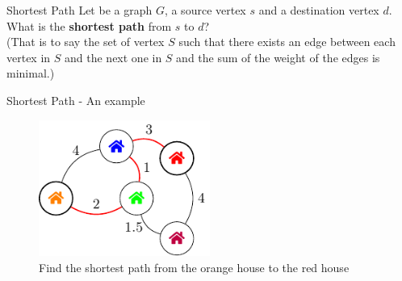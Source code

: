 \documentclass[11pt]{beamer}
\begin{document}
\begin{frame}{Shortest Path}
	Let be a graph $G$, a source vertex $s$ and a destination vertex $d$. \\
	What is the \textbf{shortest path} from $s$ to $d$? \\
	(That is to say the set of vertex $S$ such that there exists an edge between each vertex in $S$ and the next one in $S$ and the sum of the weight of the edges is minimal.)
\end{frame}

\begin{frame}{Shortest Path - An example}

\begin{figure}
	\centering
	\includegraphics[width=0.5\textwidth]{./content/figures/weightedgraph_city_example.pdf}
	\caption{Find the shortest path from the orange house to the red house}

\end{figure}
\end{frame}
\end{document}
